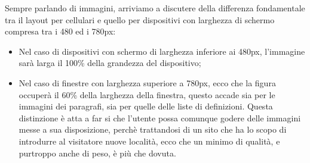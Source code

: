 Sempre parlando di immagini, arriviamo a discutere della differenza
fondamentale tra il layout per cellulari e quello per dispositivi con
larghezza di schermo compresa tra i 480 ed i 780px:
\begin{itemize}
\item Nel caso di dispositivi con schermo di larghezza inferiore ai 480px,
l'immagine sarà larga il 100\% della grandezza del dispositivo;
\item Nel caso di finestre con larghezza superiore a 780px, ecco che la figura
occuperà il 60\% della larghezza della finestra, questo accade sia per le
immagini dei paragrafi, sia per quelle delle liste di definizioni. Questa
distinzione è atta a far si che l'utente possa comunque godere delle immagini
messe a sua disposizione, perchè trattandosi di un sito che ha lo scopo di
introdurre al visitatore nuove località, ecco che un minimo di qualità, e
purtroppo anche di peso, è più che dovuta.
\end{itemize}

